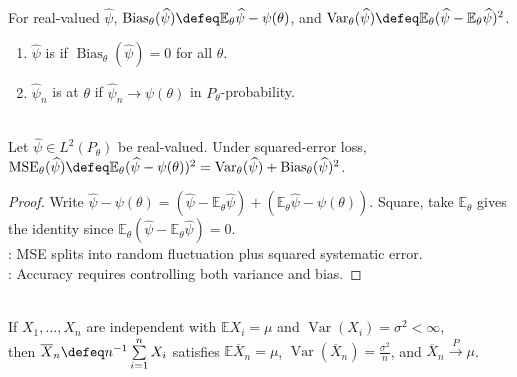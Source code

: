 \begin{definition} \label{def:bias-variance-consistency} \\
For real-valued $\widehat{\psi}$, $\operatorname{Bias}_\theta(\widehat{\psi})\defeq\mathbb{E}_\theta\widehat{\psi}-\psi(\theta)$, and $\operatorname{Var}_\theta(\widehat{\psi})\defeq\mathbb{E}_\theta(\widehat{\psi}-\mathbb{E}_\theta\widehat{\psi})^2$.
\begin{enumerate}[label=(\roman*)]
\setlength{\itemsep}{0pt}
\item $\widehat{\psi}$ is  if $\operatorname{Bias}_\theta(\widehat{\psi})=0$ for all $\theta$.
\item $\widehat{\psi}_n$ is  at $\theta$ if $\widehat{\psi}_n\to\psi(\theta)$ in $P_\theta$-probability.
\end{enumerate}
\end{definition}

\begin{proposition} \label{prop:mse-bias-variance-decomposition} \\
Let $\widehat{\psi}\in L^2(P_\theta)$ be real-valued. Under squared-error loss, $\operatorname{MSE}_\theta(\widehat{\psi})\defeq\mathbb{E}_\theta(\widehat{\psi}-\psi(\theta))^2=\operatorname{Var}_\theta(\widehat{\psi})+\operatorname{Bias}_\theta(\widehat{\psi})^2$.
\begin{proof} Write $\widehat{\psi}-\psi(\theta)=(\widehat{\psi}-\mathbb{E}_\theta\widehat{\psi})+(\mathbb{E}_\theta\widehat{\psi}-\psi(\theta))$. Square, take $\mathbb{E}_\theta$ gives the identity since $\mathbb{E}_\theta(\widehat{\psi}-\mathbb{E}_\theta\widehat{\psi})=0$.\\
: MSE splits into random fluctuation plus squared systematic error.\\
: Accuracy requires controlling both variance and bias.
\end{proof}
\end{proposition}

\begin{example} \label{ex:sample-mean-estimator} \\
If $X_1,\ldots,X_n$ are independent with $\mathbb{E}X_i=\mu$ and $\operatorname{Var}(X_i)=\sigma^2<\infty$,\\
then $\overline{X}_n\defeq n^{-1}\sum\limits_{i=1}^{n}X_i$ satisfies $\mathbb{E}\overline{X}_n=\mu$, $\operatorname{Var}(\overline{X}_n)=\frac{\sigma^2}{n}$, and $\overline{X}_n\xrightarrow{P}\mu$.
\end{example}

